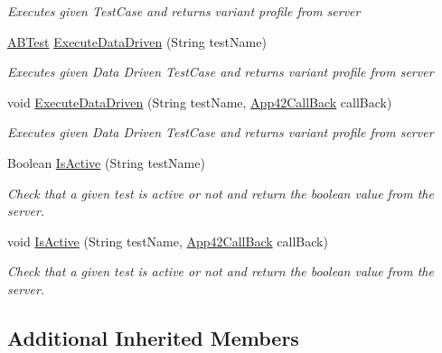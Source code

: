 \begin{DoxyCompactItemize}
\begin{DoxyCompactList}\small\item\em Executes given Test\+Case and returns variant profile from server \end{DoxyCompactList}\item 
\hyperlink{classcom_1_1shephertz_1_1app42_1_1paas_1_1sdk_1_1csharp_1_1ab_test_1_1_a_b_test}{A\+B\+Test} \hyperlink{classcom_1_1shephertz_1_1app42_1_1paas_1_1sdk_1_1csharp_1_1ab_test_1_1_a_b_test_service_a5bf748d45ed1bc7d044fda1c3d1f5218}{Execute\+Data\+Driven} (String test\+Name)
\begin{DoxyCompactList}\small\item\em Executes given Data Driven Test\+Case and returns variant profile from server \end{DoxyCompactList}\item 
void \hyperlink{classcom_1_1shephertz_1_1app42_1_1paas_1_1sdk_1_1csharp_1_1ab_test_1_1_a_b_test_service_aba44820b83ff5357a2018d7ec5c1e8fa}{Execute\+Data\+Driven} (String test\+Name, \hyperlink{interfacecom_1_1shephertz_1_1app42_1_1paas_1_1sdk_1_1csharp_1_1_app42_call_back}{App42\+Call\+Back} call\+Back)
\begin{DoxyCompactList}\small\item\em Executes given Data Driven Test\+Case and returns variant profile from server \end{DoxyCompactList}\item 
Boolean \hyperlink{classcom_1_1shephertz_1_1app42_1_1paas_1_1sdk_1_1csharp_1_1ab_test_1_1_a_b_test_service_a62bd3dc4a4304a70d9983d4d2073313b}{Is\+Active} (String test\+Name)
\begin{DoxyCompactList}\small\item\em Check that a given test is active or not and return the boolean value from the server. \end{DoxyCompactList}\item 
void \hyperlink{classcom_1_1shephertz_1_1app42_1_1paas_1_1sdk_1_1csharp_1_1ab_test_1_1_a_b_test_service_a90663b37fda3055ce340f619e35d6403}{Is\+Active} (String test\+Name, \hyperlink{interfacecom_1_1shephertz_1_1app42_1_1paas_1_1sdk_1_1csharp_1_1_app42_call_back}{App42\+Call\+Back} call\+Back)
\begin{DoxyCompactList}\small\item\em Check that a given test is active or not and return the boolean value from the server. \end{DoxyCompactList}\end{DoxyCompactItemize}
\subsection*{Additional Inherited Members}


